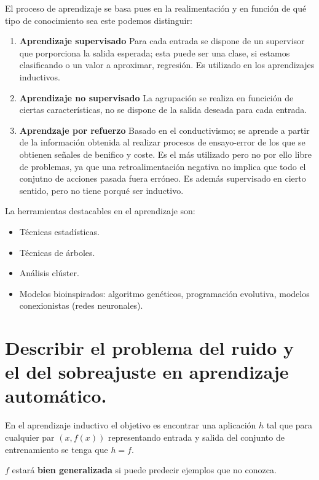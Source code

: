 \documentclass[12 pt, a4paper]{article}
\begin{document}
El proceso de aprendizaje se basa pues en la realimentación y en función de qué tipo de conocimiento sea este podemos distinguir: 

\begin{enumerate}
  \item \textbf{Aprendizaje supervisado} Para cada entrada se dispone de un supervisor que porporciona la salida esperada; esta puede ser una clase, si estamos clasificando o
  un valor a aproximar, regresión. Es utilizado en los aprendizajes inductivos. 
  \item \textbf{Aprendizaje no supervisado} La agrupación se realiza en funcición de ciertas características, no se dispone de la salida deseada para cada entrada. 
  \item \textbf{Aprendzaje por refuerzo}  Basado en el conductivismo; se aprende a partir de la información obtenida al realizar procesos de ensayo-error de los que se obtienen señales de benifico y coste.
  Es el más utilizado pero no por ello libre de problemas, ya que una retroalimentación negativa no implica que todo el conjutno de acciones pasada fuera erróneo. Es además supervisado en cierto sentido, pero no tiene porqué ser inductivo. 

\end{enumerate}

La herramientas destacables en el aprendizaje son: 

\begin{itemize}
  \item Técnicas estadísticas.
  \item Técnicas de árboles.
  \item Análisis clúster. 
  \item Modelos bioinspirados: algoritmo genéticos, programación evolutiva, modelos conexionistas (redes neuronales).
\end{itemize}

\newpage 


\section{Describir el problema del ruido y el del sobreajuste en aprendizaje automático.}

En el aprendizaje inductivo el objetivo es encontrar una aplicación $h$ tal que para cualquier par $(x,f(x))$ representando entrada y salida
del conjunto de entrenamiento se tenga que $h=f.$

$f$ estará \textbf{bien generalizada} si puede predecir ejemplos que no conozca. 
\end{document}
